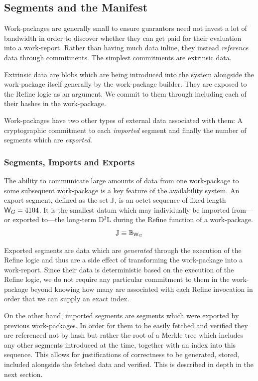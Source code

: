\subsection{Segments and the Manifest}

Work-packages are generally small to ensure guarantors need not invest a lot of bandwidth in order to discover whether they can get paid for their evaluation into a work-report. Rather than having much data inline, they instead \emph{reference} data through commitments. The simplest commitments are extrinsic data.

Extrinsic data are blobs which are being introduced into the system alongside the work-package itself generally by the work-package builder. They are exposed to the Refine logic as an argument. We commit to them through including each of their hashes in the work-package.

Work-packages have two other types of external data associated with them: A cryptographic commitment to each \emph{imported} segment and finally the number of segments which are \emph{exported}.

\subsubsection{Segments, Imports and Exports}
\label{sec:segments}

The ability to communicate large amounts of data from one work-package to some subsequent work-package is a key feature of the \Jam availability system. An export segment, defined as the set $\segment$, is an octet sequence of fixed length $\Csegmentsize = 4104$. It is the smallest datum which may individually be imported from---or exported to---the long-term D$^3$L during the Refine function of a work-package.
\begin{equation}\label{eq:segment}
  \segment \equiv \blob[\Csegmentsize]
\end{equation}

Exported segments are data which are \emph{generated} through the execution of the Refine logic and thus are a side effect of transforming the work-package into a work-report. Since their data is deterministic based on the execution of the Refine logic, we do not require any particular commitment to them in the work-package beyond knowing how many are associated with each Refine invocation in order that we can supply an exact index.

On the other hand, imported segments are segments which were exported by previous work-packages. In order for them to be easily fetched and verified they are referenced not by hash but rather the root of a Merkle tree which includes any other segments introduced at the time, together with an index into this sequence. This allows for justifications of correctness to be generated, stored, included alongside the fetched data and verified. This is described in depth in the next section.

